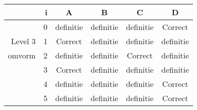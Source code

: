 \begin{tabular}{ rr| c|c|c|c}\hline\hline
     & i & \textbf{A} & \textbf{B} & \textbf{C} & \textbf{D}\\\hline

&0&definitie&definitie&definitie&Correct\cellcolor[gray]{0.6}\\
Level 3 & 1&Correct\cellcolor[gray]{0.6}&definitie&definitie&definitie\\
omvorm &2&definitie&definitie&Correct\cellcolor[gray]{0.6}&definitie\\
&3&Correct\cellcolor[gray]{0.6}&definitie&definitie&definitie\\
&4&definitie&definitie&definitie&Correct\cellcolor[gray]{0.6}\\
&5&definitie&definitie&definitie&Correct\cellcolor[gray]{0.6}\\
\hline\end{tabular}\par\ \newline

